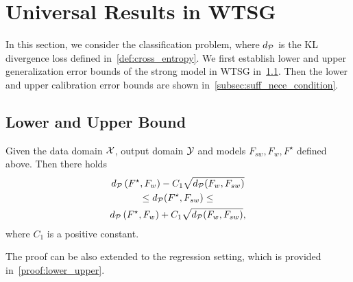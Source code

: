 \section{Universal Results in WTSG} \label{section:universal_result}

In this section, we consider the classification problem, where $d_\mathcal{P}$ is the KL divergence loss defined in~\cref{def:cross_entropy}.
We first establish lower and upper generalization error bounds of the strong model in WTSG in~\cref{section_lower_upper}.
Then the lower and upper calibration error bounds are shown in~\cref{subsec:suff_nece_condition}.



\subsection{Lower and Upper Bound} \label{section_lower_upper}



\begin{theorem} \label{lemma:upper_lower_inf}
Given the data domain $\mathcal{X}$, output domain $\mathcal{Y}$ and models $F_{sw}, F_w, F^\star$ defined above. 
Then there holds
\begin{multline}
    d_\mathcal{P}\left( F^\star, F_w \right) - C_1\sqrt{d_\mathcal{P}(F_w, F_{sw})} \\ \le d_\mathcal{P}(F^\star, F_{sw}) \le \\ d_\mathcal{P}\left( F^\star, F_w \right) + C_1\sqrt{d_\mathcal{P}(F_w, F_{sw})},
\end{multline}
where $C_1$ is a positive constant.
\end{theorem}

\begin{remark}
    The proof can be also extended to the regression setting, which is provided in~\cref{proof:lower_upper}.
\end{remark}





